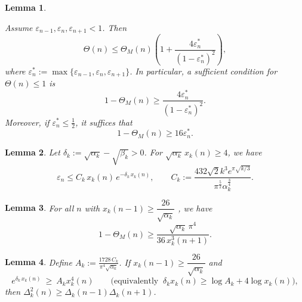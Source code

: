 \documentclass[10pt,a4paper]{amsart}
\newtheorem{lem}{Lemma}
\begin{document}
\begin{lem}\label{lem:factor}

Assume $\varepsilon_{n-1},\varepsilon_n,\varepsilon_{n+1}<1$. Then
\begin{equation}\label{eq:factor-consequence-exact}
\Theta(n)\le\Theta_M(n)\left(1+\frac{4\varepsilon_n^\ast}
{(1-\varepsilon_n^\ast)^2}\right),
\end{equation}
where $\varepsilon_n^\ast:=\max\{\varepsilon_{n-1},\varepsilon_n,\varepsilon_{n+1}\}$.
In particular, a sufficient condition for $\Theta(n)\le 1$ is
\begin{equation}\label{eq:gap-vs-error-exact}
1-\Theta_M(n)\ge\frac{4\varepsilon_n^\ast}{(1-\varepsilon_n^\ast)^2}.
\end{equation}
Moreover, if $\varepsilon_n^\ast\le \tfrac12$, it suffices that
\begin{equation}\label{eq:gap-vs-error-crude}
1-\Theta_M(n)\ge16\varepsilon_n^\ast.
\end{equation}
\end{lem}

\begin{lem}\label{lem:relerr}
Let $\delta_k:=\sqrt{\alpha_k}-\sqrt{\beta_k}>0$. For $\sqrt{\alpha_k}\,x_k(n)\ge4$, we have
\begin{equation}\label{eq:eps}
\varepsilon_n \le C_k\,x_k(n)\,e^{-\delta_k\,x_k(n)},\qquad
C_k:=\frac{432\sqrt{2}k^3 e^{\pi\sqrt{k/3}}}{\pi^{\frac{5}{2}}\alpha_k^{\frac{3}{4}}}.
\end{equation}
\end{lem}

\begin{lem}\label{lem:concavity}
For all $n$ with $x_k(n-1)\ge \dfrac{26}{\sqrt{\alpha_k}}$
, we have
\begin{equation}\label{eq:gap}
1-\Theta_M(n) \ge \frac{\sqrt{\alpha_k}\,\pi^4}{36\,x_k^3(n+1)}.
\end{equation}
\end{lem}

\begin{lem}\label{lem:analytic}
Define
$A_k:=\frac{1728\,C_k}{\pi^4\sqrt{\alpha_k}}$.
If $x_k(n-1)\ge \dfrac{26}{\sqrt{\alpha_k}}$ and
\begin{equation}\label{eq:key-ineq}
e^{\delta_k\,x_k(n)}\ \ge\ A_k x_k^4(n)
\qquad\big(\text{equivalently }~ \delta_k x_k(n)\ge \log A_k+ 4\log x_k(n)\big),
\end{equation}
then $\Delta_k^2(n)\ge \Delta_k(n-1)\Delta_k(n+1)$.
\end{lem}
\end{document}
